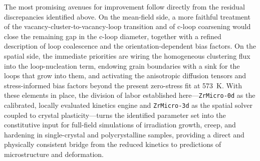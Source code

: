 \documentclass{article}
\newcommand{\ZrM}{\texttt{ZrMicro-3d}}
\newcommand{\ZrOd}{\texttt{ZrMicro-0d}}
\begin{document}
The most promising avenues for improvement follow directly from the residual discrepancies identified above. On the mean-field side, a more faithful treatment of the vacancy-cluster-to-vacancy-loop transition and of c-loop coarsening would close the remaining gap in the c-loop diameter, together with a refined description of loop coalescence and the orientation-dependent bias factors. On the spatial side, the immediate priorities are wiring the homogeneous clustering flux into the loop-nucleation term, endowing grain boundaries with a sink for the loops that grow into them, and activating the anisotropic diffusion tensors and stress-informed bias factors beyond the present zero-stress fit at 573~K. With these elements in place, the division of labor established here---{\ZrOd} as the calibrated, locally evaluated kinetics engine and {\ZrM} as the spatial solver coupled to crystal plasticity---turns the identified parameter set into the constitutive input for full-field simulations of irradiation growth, creep, and hardening in single-crystal and polycrystalline samples, providing a direct and physically consistent bridge from the reduced kinetics to predictions of microstructure and deformation.

\newpage


\end{document}
